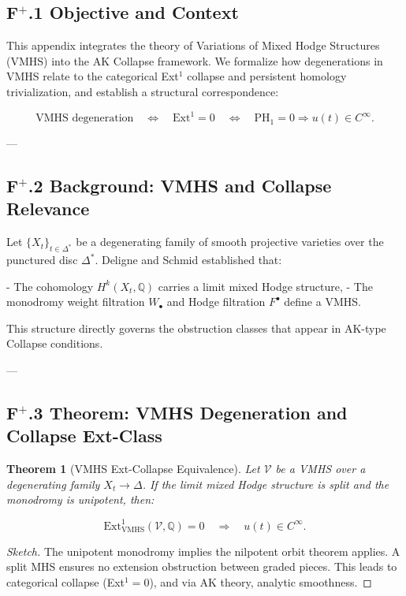 \documentclass[11pt]{article}
\newtheorem{theorem}{Theorem}[section]
\begin{document}
\subsection*{F$^+$.1 Objective and Context}

This appendix integrates the theory of Variations of Mixed Hodge Structures (VMHS) into the AK Collapse framework.  
We formalize how degenerations in VMHS relate to the categorical Ext$^1$ collapse and persistent homology trivialization,  
and establish a structural correspondence:

\[
\mathrm{VMHS} \text{ degeneration} \quad \Leftrightarrow \quad \mathrm{Ext}^1 = 0 \quad \Leftrightarrow \quad \mathrm{PH}_1 = 0 \Rightarrow u(t) \in C^\infty.
\]

---

\subsection*{F$^+$.2 Background: VMHS and Collapse Relevance}

Let \( \{X_t\}_{t \in \Delta^*} \) be a degenerating family of smooth projective varieties over the punctured disc \( \Delta^* \).  
Deligne and Schmid established that:

- The cohomology \( H^k(X_t, \mathbb{Q}) \) carries a limit mixed Hodge structure,
- The monodromy weight filtration \( W_\bullet \) and Hodge filtration \( F^\bullet \) define a VMHS.

This structure directly governs the obstruction classes that appear in AK-type Collapse conditions.

---

\subsection*{F$^+$.3 Theorem: VMHS Degeneration and Collapse Ext-Class}

\begin{theorem}[VMHS Ext-Collapse Equivalence]
Let \( \mathcal{V} \) be a VMHS over a degenerating family \( X_t \to \Delta \).  
If the limit mixed Hodge structure is split and the monodromy is unipotent, then:

\[
\mathrm{Ext}^1_{\mathrm{VMHS}}(\mathcal{V}, \mathbb{Q}) = 0 \quad \Rightarrow \quad u(t) \in C^\infty.
\]
\end{theorem}

\begin{proof}[Sketch]
The unipotent monodromy implies the nilpotent orbit theorem applies.  
A split MHS ensures no extension obstruction between graded pieces.  
This leads to categorical collapse (Ext$^1 = 0$), and via AK theory, analytic smoothness.
\end{proof}
\end{document}
